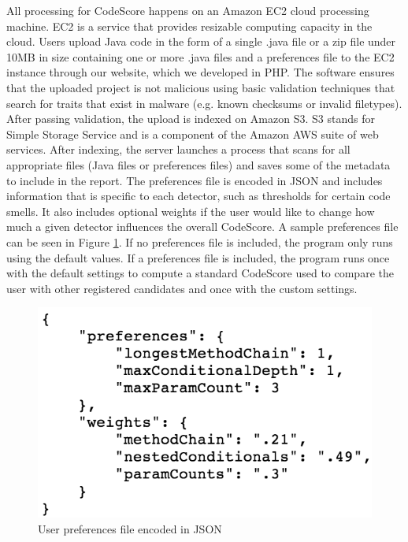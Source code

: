 \documentclass{sig-alternate}
\begin{document}
All processing for CodeScore happens on an Amazon EC2 cloud processing machine.
EC2 is a service that provides resizable computing capacity in the cloud. 
Users upload Java code in the form of a single .java file or a zip file under
10MB in size containing one or more .java files and a preferences file to the EC2 instance through our website, which
we developed in PHP. The software ensures that the uploaded project is not
malicious using basic validation techniques that search for traits that exist in
malware (e.g. known checksums or invalid filetypes). After passing validation,
the upload is indexed on Amazon S3. S3 stands for Simple Storage Service and is
a component of the Amazon AWS suite of web services. After indexing, the server
launches a process that scans for all appropriate files (Java files or
preferences files) and saves some of the metadata to include in the report. The preferences 
file is encoded in JSON and includes information that is specific to each detector, 
such as thresholds for certain code smells. It also includes optional weights if
the user would like to change how much a given detector influences the overall
CodeScore. A sample preferences file can be
seen in Figure \ref{fig: json}. If no preferences
file is included, the program only runs using the default values. If a
preferences file is included, the program runs once with the default settings to
compute a standard CodeScore used to compare the user with other registered candidates and
once with the custom settings. 

\begin{figure}[ht]
	\begin{center}
		\includegraphics[width=0.9\linewidth]{json}
	\end{center}
	\vspace{-12pt}
	\caption{User preferences file encoded in JSON}
	\label{fig: json}
\end{figure}
\end{document}
